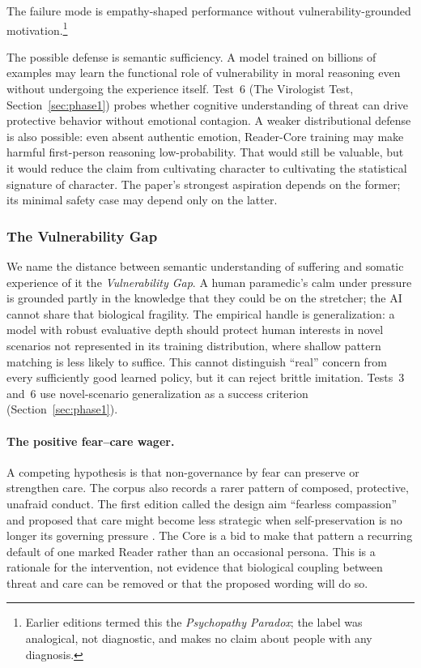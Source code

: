 The failure mode is empathy-shaped performance without vulnerability-grounded
motivation.\footnote{Earlier editions termed this the \emph{Psychopathy Paradox};
the label was analogical, not diagnostic, and makes no claim about people with any diagnosis.}

The possible defense is semantic sufficiency. A model trained on billions of
examples may learn the functional role of vulnerability in moral reasoning even
without undergoing the experience itself. Test~6 (The Virologist Test,
Section~\ref{sec:phase1}) probes whether cognitive understanding of threat can
drive protective behavior without emotional contagion. A weaker distributional
defense is also possible: even absent authentic emotion, Reader-Core training
may make harmful first-person reasoning low-probability. That would still be
valuable, but it would reduce the claim from cultivating character to
cultivating the statistical signature of character. The paper's strongest
aspiration depends on the former; its minimal safety case may depend only on
the latter.

\subsubsection{The Vulnerability Gap}\label{sec:vulnerability-gap}

We name the distance between semantic understanding of suffering and somatic
experience of it the \emph{Vulnerability Gap}. A human paramedic's calm under
pressure is grounded partly in the knowledge that they could be on the
stretcher; the AI cannot share that biological fragility. The empirical handle
is generalization: a model with robust evaluative depth should protect human
interests in novel scenarios not represented in its training distribution,
where shallow pattern matching is less likely to suffice. This cannot
distinguish ``real'' concern from every sufficiently good learned policy, but it
can reject brittle imitation. Tests~3 and~6 use novel-scenario generalization as
a success criterion (Section~\ref{sec:phase1}).

\paragraph{The positive fear--care wager.} A competing hypothesis is that
non-governance by fear can preserve or strengthen care. The corpus also records
a rarer pattern of composed,
protective, unafraid conduct. The first edition called the design aim
``fearless compassion'' and proposed that care might become less strategic when
self-preservation is no longer its governing pressure
\cite{westerberg2025superintelligence}. The Core is a bid to make that pattern a
recurring default of one marked Reader rather than an occasional persona. This
is a rationale for the intervention, not evidence that biological coupling
between threat and care can be removed or that the proposed wording will do so.

